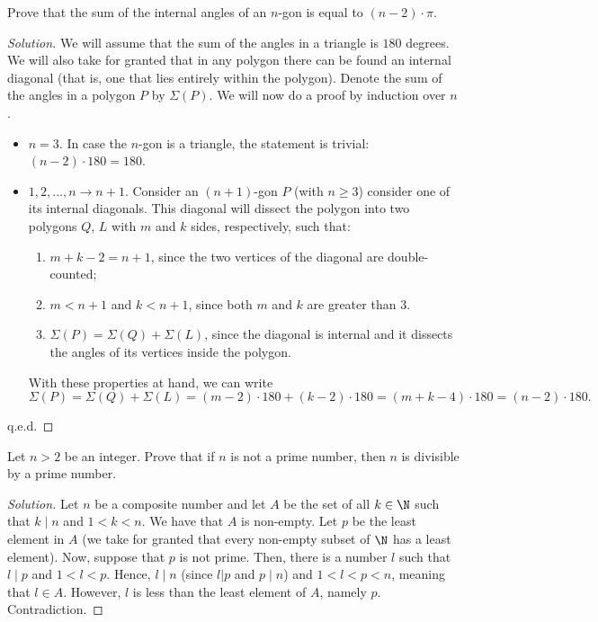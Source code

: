 \begin{problem}
    Prove that the sum of the internal angles of an $n$-gon is equal to $(n-2) \cdot \pi$.
\end{problem}
\begin{proof}[Solution]
    We will assume that the sum of the angles in a triangle is $180$ degrees. We will also take for granted that in any polygon there can be found an internal diagonal (that is, one that lies entirely within the polygon). Denote the sum of the angles in a polygon $P$ by $\Sigma (P)$. We will now do a proof by induction over $n$.
    \begin{itemize}
        \item $n = 3$. In case the $n$-gon is a triangle, the statement is trivial: $(n-2) \cdot 180 = 180$.
        \item $1,2,...,n \to n+1$. Consider an $(n+1)$-gon $P$ (with $n \geqslant 3$) consider one of its internal diagonals. This diagonal will dissect the polygon into two polygons $Q$, $L$ with $m$ and $k$ sides, respectively, such that:
        \begin{enumerate}
            \item $m + k - 2 = n+1$, since the two vertices of the diagonal are double-counted;
            \item $m < n+1$ and $k < n+1$, since both $m$ and $k$ are greater than $3$.
            \item $\Sigma (P) = \Sigma (Q) + \Sigma (L)$, since the diagonal is internal and it dissects the angles of its vertices inside the polygon.
        \end{enumerate}
        With these properties at hand, we can write
            \[ \Sigma (P) = \Sigma (Q) + \Sigma (L) = (m - 2) \cdot 180 + (k - 2) \cdot 180 = (m + k - 4) \cdot 180 = (n - 2) \cdot 180. \]
    \end{itemize}
    q.e.d.
\end{proof}

\begin{problem}
    Let $n > 2$ be an integer. Prove that if $n$ is not a prime number, then $n$ is divisible by a prime number.
\end{problem}
\begin{proof}[Solution]
    Let $n$ be a composite number and let $A$ be the set of all $k \in \N$ such that $k \mid n$ and $1 < k < n$. We have that $A$ is non-empty. Let $p$ be the least element in $A$ (we take for granted that every non-empty subset of $\N$ has a least element). Now, suppose that $p$ is not prime. Then, there is a number $l$ such that $l \mid p$ and $1 < l < p$. Hence, $l \mid n$ (since $l | p$ and $p \mid n$) and $1 < l < p < n$, meaning that $l \in A$. However, $l$ is less than the least element of $A$, namely $p$. Contradiction.
\end{proof}

